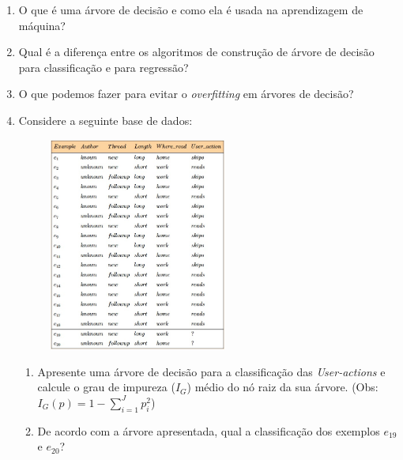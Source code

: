 \documentclass{article}
\begin{document}
    \begin{enumerate}

    \item O que é uma árvore de decisão e como ela é usada na aprendizagem de máquina?

    \item Qual é a diferença entre os algoritmos de construção de árvore de decisão para classificação e para regressão?

    \item O que podemos fazer para evitar o \textit{overfitting} em árvores de decisão?
    
    \item Considere a seguinte base de dados:
    
    \begin{figure}[!ht]
         \centering
         \includegraphics[width=0.55\textwidth]{abc.jpg}
    \end{figure}



    \begin{enumerate}
    
    \item Apresente uma árvore de decisão para a classificação das \textit{User-actions} e calcule o grau de impureza ($I_G$) médio do nó raiz da sua árvore. (Obs: $I_G(p) = 1 - \sum_{i=1}^{J}p_i^2$)
        
    \item De acordo com a árvore apresentada, qual a classificação dos exemplos $e_{19}$ e $e_{20}$?  
    \end{enumerate}
    \end{enumerate}

    
\end{document}
